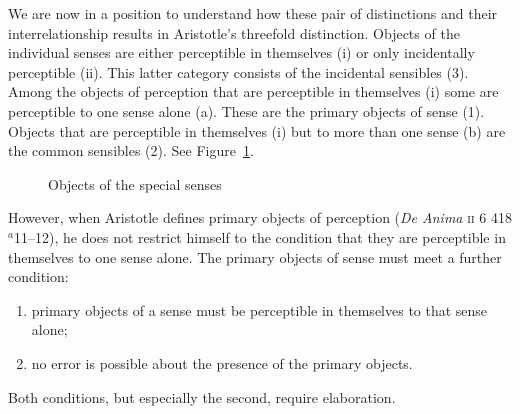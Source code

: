 We are now in a position to understand how these pair of distinctions and their interrelationship results in Aristotle's threefold distinction. Objects of the individual senses are either perceptible in themselves (i) or only incidentally perceptible (ii). This latter category consists of the incidental sensibles (3). Among the objects of perception that are perceptible in themselves (i) some are perceptible to one sense alone (a). These are the primary objects of sense (1). Objects that are perceptible in themselves (i) but to more than one sense (b) are the common sensibles (2). See Figure~\ref{fig:special}.

\begin{figure}[ht]
    \begin{center}
    \end{center}
	\caption{Objects of the special senses}
    \label{fig:special}
\end{figure}

However, when Aristotle defines primary objects of perception (\emph{De Anima} \textsc{ii} 6 418\( ^{a} \)11--12), he does not restrict himself to the condition that they are perceptible in themselves to one sense alone. The primary objects of sense must meet a further condition: 
\begin{enumerate}[(1)]
	\item primary objects of a sense must be perceptible in themselves to that sense alone;
	\item no error is possible about the presence of the primary objects.
\end{enumerate}
Both conditions, but especially the second, require elaboration. 


